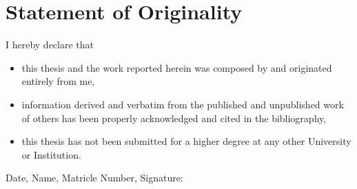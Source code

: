 \documentclass[../main.tex]{subfile}
\begin{document}
\chapter*{Statement of Originality}I hereby declare that
\begin{itemize}
\item this thesis and the work reported herein was composed by and originated entirely from me,
\item information derived and verbatim from the published and unpublished work of others has been properly acknowledged and cited in the bibliography,
\item this thesis has not been submitted for a higher degree at any other University or Institution.
\end{itemize}

Date, Name, Matricle Number, Signature:
\end{document}
